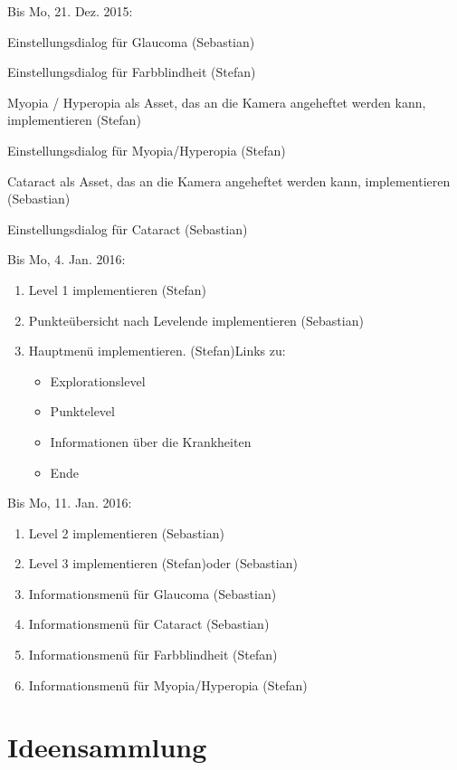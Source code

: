 \documentclass[a4paper, 11pt]{scrartcl}
\newcommand{\fertig}{\color{ForestGreen}}
\newcommand{\entwickler}[1]{\textcolor{BurntOrange}{(#1)}}
\newcommand{\Stefan}{\entwickler{Stefan}}
\newcommand{\Sebastian}{\entwickler{Sebastian}}
\begin{document}
Bis Mo, 21. Dez. 2015:
\begin{enumerate}
    \item Einstellungsdialog für Glaucoma \Sebastian
    {\fertig \item Einstellungsdialog für Farbblindheit \Stefan }
    \item Myopia / Hyperopia als Asset, das an die Kamera angeheftet werden kann, implementieren \Stefan
    \item Einstellungsdialog für Myopia/Hyperopia \Stefan
    \item Cataract als Asset, das an die Kamera angeheftet werden kann, implementieren \Sebastian
    \item Einstellungsdialog für Cataract \Sebastian
\end{enumerate}
Bis Mo, 4. Jan. 2016:
\begin{enumerate}
    \item Level 1 implementieren \Stefan
    \item Punkteübersicht nach Levelende implementieren \Sebastian
    \item Hauptmenü implementieren. \Stefan Links zu:
        \begin{itemize}
        \item Explorationslevel
        \item Punktelevel
        \item Informationen über die Krankheiten
        \item Ende
    \end{itemize}
\end{enumerate}
Bis Mo, 11. Jan. 2016:
\begin{enumerate}
    \item Level 2 implementieren \Sebastian
    \item Level 3 implementieren \Stefan oder \Sebastian
    \item Informationsmenü für Glaucoma \Sebastian
    \item Informationsmenü für Cataract \Sebastian
    \item Informationsmenü für Farbblindheit \Stefan
    \item Informationsmenü für Myopia/Hyperopia \Stefan
\end{enumerate}


\section{Ideensammlung}
\end{document}
